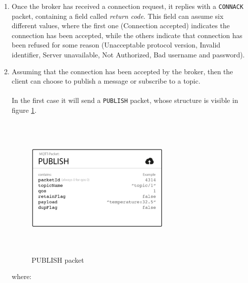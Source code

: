 \documentclass[12pt]{report}
\begin{document}
{\begin{enumerate}
\begin{itemize}
\setlength{\itemindent}{+4mm}
\item[$\bullet$] \emph{clientId} is a identifier, unique per broker, each client must have.\\
  \emph{If you do not need a state to be hold by the broker, in MQTT 3.1.1 it is possible to send an empty value.}
  \item[$\bullet$] \emph{clean session} is used to establish persistent connections
  \item[$\bullet$] \emph{username} and \emph{password} are used to authenticate the user in a password-protected broker. These credentials are sent in plain-text, we will see later how to face this issue.
  \item[$\bullet$] \emph{keep alive} is nothing but a time interval used by the client to commit regular \texttt{PING Request} messages to the broker (this last one will reply with a \texttt{PING Response} message)
\end{itemize}

\item Once the broker has received a connection request, it replies with a \texttt{CONNACK} packet, containing a field called \emph{return code}. 
This field can assume six different values, where the first one (Connection accepted) indicates the connection has been accepted, while the others indicate that connection has been refused for some reason (Unacceptable protocol version, Invalid identifier, Server unavailable, Not Authorized, Bad username and password).

\item Assuming that the connection has been accepted by the broker, then the client can choose to publish a message or subscribe to a topic.\\\\
In the first case it will send a \texttt{PUBLISH} packet, whose structure is visible in figure \ref{fig:publishpacket}.

\begin{figure}[H]
\includegraphics[width=7cm,height=7cm,keepaspectratio]{publish_message}
\centering
\caption{PUBLISH packet}
\label{fig:publishpacket}
\end{figure}
where:


\end{enumerate}}
\end{document}
